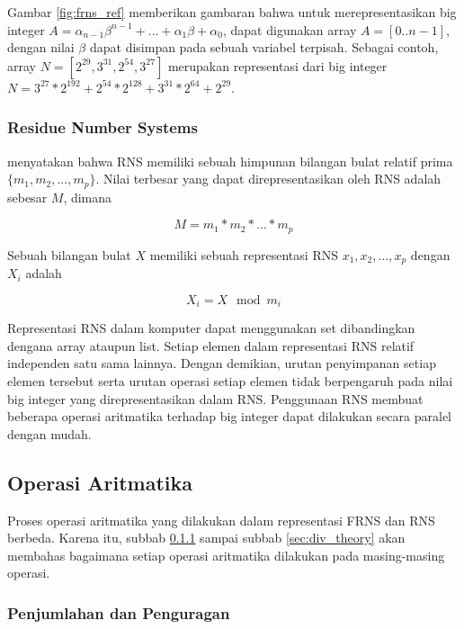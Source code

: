     Gambar \ref{fig:frns_ref} memberikan gambaran bahwa untuk merepresentasikan big integer $A = \alpha_{n-1}\beta^{n-1}+...+\alpha_{1}\beta+\alpha_{0}$, dapat digunakan array $A = [0..n-1]$, dengan nilai $\beta$ dapat disimpan pada sebuah variabel terpisah. Sebagai contoh, array $N = [2^29, 3^31, 2^54, 3^27]$ merupakan representasi dari big integer $N = 3^27*2^192 + 2^54*2^128 + 3^31*2^64 + 2^29$.

    \subsubsection{Residue Number Systems} \label{sec:rns}
    \citet{rns_survey} menyatakan bahwa RNS memiliki sebuah himpunan bilangan bulat relatif prima $\{m_1,m_2,...,m_p\}$. Nilai terbesar yang dapat direpresentasikan oleh RNS adalah sebesar $M$, dimana

    \begin{equation}
      M = m_1 * m_2 * ... * m_p
    \end{equation}

    Sebuah bilangan bulat $X$ memiliki sebuah representasi RNS ${x_1,x_2,...,x_p}$ dengan $X_i$ adalah

    \begin{equation}
      X_i = X \mod m_i
    \end{equation}


    Representasi RNS dalam komputer dapat menggunakan set dibandingkan dengana array ataupun list. Setiap elemen dalam representasi RNS relatif independen satu sama lainnya. Dengan demikian, urutan penyimpanan setiap elemen tersebut serta urutan operasi setiap elemen tidak berpengaruh pada nilai big integer yang direpresentasikan dalam RNS. Penggunaan RNS membuat beberapa operasi aritmatika terhadap big integer dapat dilakukan secara paralel dengan mudah.


  \subsection{Operasi Aritmatika}

    Proses operasi aritmatika yang dilakukan dalam representasi FRNS dan RNS berbeda. Karena itu, subbab \ref{sec:add_sub_theory} sampai subbab \ref{sec:div_theory} akan membahas bagaimana setiap operasi aritmatika dilakukan pada masing-masing operasi.


    \subsubsection{Penjumlahan dan Penguragan} \label{sec:add_sub_theory}
